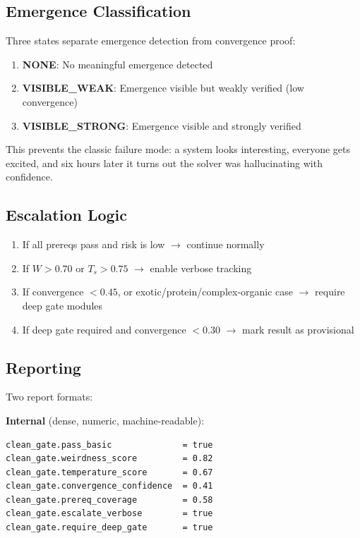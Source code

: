 \documentclass[11pt,a4paper]{article}
\begin{document}
\subsection{Emergence Classification}

Three states separate emergence detection from convergence proof:

\begin{enumerate}[nosep]
  \item \textbf{NONE}: No meaningful emergence detected
  \item \textbf{VISIBLE\_WEAK}: Emergence visible but weakly verified (low convergence)
  \item \textbf{VISIBLE\_STRONG}: Emergence visible and strongly verified
\end{enumerate}

This prevents the classic failure mode: a system looks interesting,
everyone gets excited, and six hours later it turns out the solver was
hallucinating with confidence.

\subsection{Escalation Logic}

\begin{enumerate}
  \item If all prereqs pass and risk is low $\rightarrow$ continue normally
  \item If $W > 0.70$ or $T_s > 0.75$ $\rightarrow$ enable verbose tracking
  \item If convergence $< 0.45$, or exotic/protein/complex-organic case
        $\rightarrow$ require deep gate modules
  \item If deep gate required and convergence $< 0.30$ $\rightarrow$
        mark result as provisional
\end{enumerate}

\subsection{Reporting}

Two report formats:

\textbf{Internal} (dense, numeric, machine-readable):
\begin{lstlisting}
clean_gate.pass_basic              = true
clean_gate.weirdness_score         = 0.82
clean_gate.temperature_score       = 0.67
clean_gate.convergence_confidence  = 0.41
clean_gate.prereq_coverage         = 0.58
clean_gate.escalate_verbose        = true
clean_gate.require_deep_gate       = true
\end{lstlisting}
\end{document}
